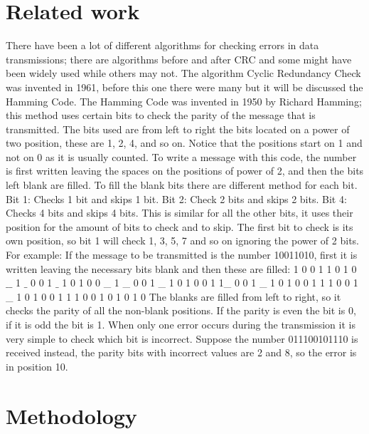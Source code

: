 \documentclass[10pt,twocolumn,letterpaper]{article}
\begin{document}
\section{Related work}
There have been a lot of different algorithms for checking errors in data transmissions; there are algorithms before and after CRC and some might have been widely used while others may not. The algorithm Cyclic Redundancy Check was invented in 1961, before this one there were many but it will be discussed the Hamming Code.
The Hamming Code was invented in 1950 by Richard Hamming; this method uses certain bits to check the parity of the message that is transmitted. The bits used are from left to right the bits located on a power of two position, these are 1, 2, 4, and so on. Notice that the positions start on 1 and not on 0 as it is usually counted. 
To write a message with this code, the number is first written leaving the spaces on the positions of power of 2, and then the bits left blank are filled. To fill the blank bits there are different method for each bit.
Bit 1: Checks 1 bit and skips 1 bit.
Bit 2: Check 2 bits and skips 2 bits.
Bit 4: Checks 4 bits and skips 4 bits.
This is similar for all the other bits, it uses their position for the amount of bits to check and to skip. The first bit to check is its own position, so bit 1 will check 1, 3, 5, 7 and so on ignoring the power of 2 bits.
For example:
If the message to be transmitted is the number 10011010, first it is written leaving the necessary bits blank and then these are filled:
1 0 0 1 1 0 1 0
$ \_\_$ 1 $\_$ 0 0 1 $\_$ 1 0 1 0
0 \_ 1 \_ 0 0 1 \_ 1 0 1 0
0 1 1\_ 0 0 1 \_ 1 0 1 0
0 1 1 1 0 0 1 \_ 1 0 1 0
0 1 1 1 0 0 1 0 1 0 1 0
The blanks are filled from left to right, so it checks the parity of all the non-blank positions. If the parity is even the bit is 0, if it is odd the bit is 1.
When only one error occurs during the transmission it is very simple to check which bit is incorrect. Suppose the number 011100101110 is received instead, the parity bits with incorrect values are 2 and 8, so the error is in position 10.

\section{Methodology}
\end{document}
